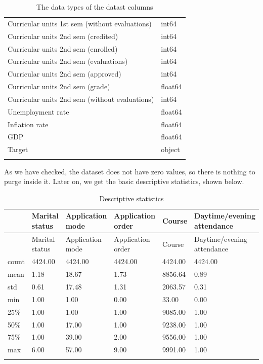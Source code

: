 \documentclass[
  letterpaper,
  DIV=11,
  numbers=noendperiod]{scrartcl}
\begin{document}
\begin{longtable}[]{@{}ll@{}}
Curricular units 1st sem (without evaluations) & int64 \\
Curricular units 2nd sem (credited) & int64 \\
Curricular units 2nd sem (enrolled) & int64 \\
Curricular units 2nd sem (evaluations) & int64 \\
Curricular units 2nd sem (approved) & int64 \\
Curricular units 2nd sem (grade) & float64 \\
Curricular units 2nd sem (without evaluations) & int64 \\
Unemployment rate & float64 \\
Inflation rate & float64 \\
GDP & float64 \\
Target & object \\
\caption{\label{tbl-example}The data types of the datast
columns}\tabularnewline
\end{longtable}

As we have checked, the dataset does not have zero values, so there is
nothing to purge inside it. Later on, we get the basic descriptive
statistics, shown below.

\hypertarget{tab-descstat-1}{}
\begin{longtable}[]{@{}llllll@{}}
\toprule\noalign{}
& Marital status & Application mode & Application order & Course &
Daytime/evening attendance \\
\midrule\noalign{}
\endfirsthead
\toprule\noalign{}
& Marital status & Application mode & Application order & Course &
Daytime/evening attendance \\
\midrule\noalign{}
\endhead
\bottomrule\noalign{}
\endlastfoot
count & 4424.00 & 4424.00 & 4424.00 & 4424.00 & 4424.00 \\
mean & 1.18 & 18.67 & 1.73 & 8856.64 & 0.89 \\
std & 0.61 & 17.48 & 1.31 & 2063.57 & 0.31 \\
min & 1.00 & 1.00 & 0.00 & 33.00 & 0.00 \\
25\% & 1.00 & 1.00 & 1.00 & 9085.00 & 1.00 \\
50\% & 1.00 & 17.00 & 1.00 & 9238.00 & 1.00 \\
75\% & 1.00 & 39.00 & 2.00 & 9556.00 & 1.00 \\
max & 6.00 & 57.00 & 9.00 & 9991.00 & 1.00 \\
\caption{Descriptive statistics }\tabularnewline
\end{longtable}
\end{document}
